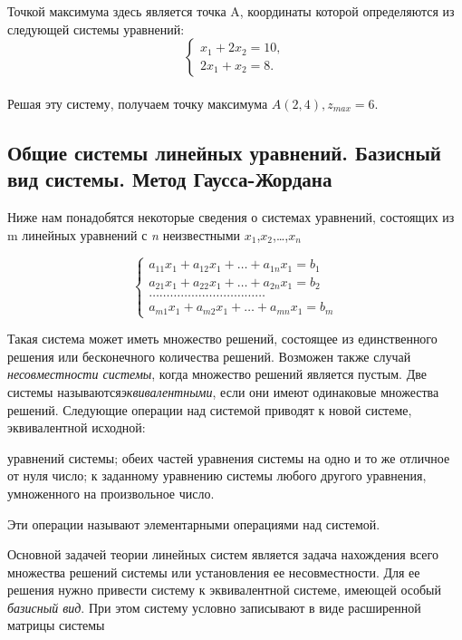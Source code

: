 Точкой максимума  здесь является точка A, координаты которой определяются из следующей системы уравнений:\\

$$\begin{cases}
x_{1} + 2x_{2} =10,\\
2x_{1} + x_{2} =8.
\end{cases}$$\\
Решая эту систему, получаем  точку максимума $A(2,4), z_{max} =6$.

\subsection{Общие системы линейных уравнений. Базисный вид системы. Метод Гаусса-Жордана}
Ниже нам понадобятся некоторые сведения о системах уравнений, состоящих из m линейных уравнений с \textit {n} неизвестными $x_1$,$x_2$,\dots,$x_\textit{n}$

\begin{equation*}
\begin{cases}
a_{11}x_1 + a_{12}x_1 + \dots + a_{1n}x_1 =b_1\\
a_{21}x_1 + a_{22}x_1 + \dots + a_{2n}x_1 =b_2\\
\dots\dots\dots\dots\dots\dots\dots\dots\dots\dots\dots\\
a_{m1}x_1 + a_{m2}x_1 + \dots + a_{mn}x_1 =b_m
\end{cases}
\end{equation*}

Такая система может иметь множество решений, состоящее из единственного решения или бесконечного количества решений. Возможен также случай \textit{несовместности системы}, когда множество решений является пустым. Две системы называются\textit {эквивалентными}, если они имеют одинаковые множества решений. Следующие операции над системой приводят к новой системе, эквивалентной исходной:
		\begin{enumerate}
			\renewcommand{\theenumi}{(\arabic{enumi})}
			\renewcommand{\labelenumi}{\arabic{enumi})}
			 уравнений системы;
			 обеих частей уравнения системы на одно и то же отличное от нуля число;
			 к заданному уравнению системы любого другого уравнения, умноженного на произвольное число.
		\end{enumerate}
Эти операции называют элементарными операциями над системой.

Основной задачей теории линейных систем является задача нахождения всего множества решений системы или установления ее несовместности. Для ее решения нужно привести систему к эквивалентной системе, имеющей особый \textit{базисный вид}. При этом систему условно записывают в виде расширенной матрицы системы

